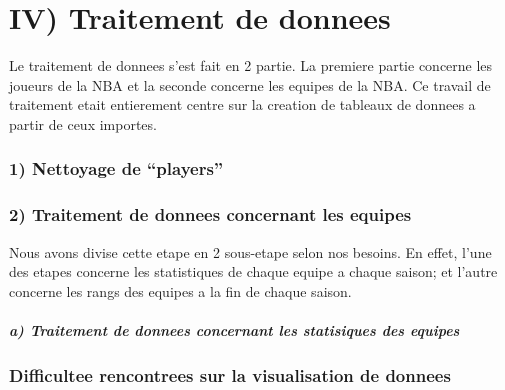 \documentclass[
]{article}
\begin{document}
\hypertarget{iv-traitement-de-donnees}{%
\section{\texorpdfstring{\textbf{IV) Traitement de
donnees}}{IV) Traitement de donnees}}\label{iv-traitement-de-donnees}}

Le traitement de donnees s'est fait en 2 partie. La premiere partie
concerne les joueurs de la NBA et la seconde concerne les equipes de la
NBA. Ce travail de traitement etait entierement centre sur la creation
de tableaux de donnees a partir de ceux importes.

\hypertarget{nettoyage-de-players}{%
\subsubsection{\texorpdfstring{\textbf{1) Nettoyage de
``players''}}{1) Nettoyage de ``players''}}\label{nettoyage-de-players}}

\hypertarget{traitement-de-donnees-concernant-les-equipes}{%
\subsubsection{\texorpdfstring{\textbf{2) Traitement de donnees
concernant les
equipes}}{2) Traitement de donnees concernant les equipes}}\label{traitement-de-donnees-concernant-les-equipes}}

Nous avons divise cette etape en 2 sous-etape selon nos besoins. En
effet, l'une des etapes concerne les statistiques de chaque equipe a
chaque saison; et l'autre concerne les rangs des equipes a la fin de
chaque saison.

\hypertarget{a-traitement-de-donnees-concernant-les-statisiques-des-equipes}{%
\subparagraph{\texorpdfstring{\textbf{a) Traitement de donnees
concernant les statisiques des
equipes}}{a) Traitement de donnees concernant les statisiques des equipes}}\label{a-traitement-de-donnees-concernant-les-statisiques-des-equipes}}

\hypertarget{difficultee-rencontrees-sur-la-visualisation-de-donnees}{%
\subsubsection{\texorpdfstring{\textbf{Difficultee rencontrees sur la
visualisation de
donnees}}{Difficultee rencontrees sur la visualisation de donnees}}\label{difficultee-rencontrees-sur-la-visualisation-de-donnees}}
\end{document}
